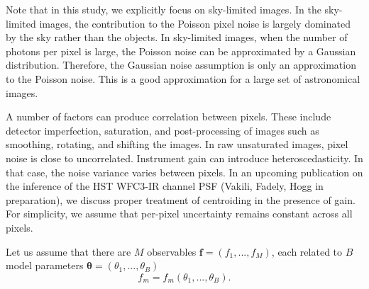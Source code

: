 \documentclass[onecolumn]{aastex61}
\newcommand{\beq}{\begin{equation}}
\newcommand{\eeq}{\end{equation}}
\newcommand{\todo}[1]{{\textcolor{dred}{ #1}}}
\begin{document}

\todo{Note that in this study, we explicitly focus on sky-limited images. In the sky-limited images, the contribution 
to the Poisson pixel noise is largely dominated by the sky rather than the objects. In sky-limited images, when the number of photons per pixel is large, the Poisson noise can be approximated by a Gaussian distribution. Therefore, the Gaussian noise assumption is only an approximation to the Poisson noise. This is a good approximation for a large set of astronomical images.} 

\todo{A number of factors can produce correlation between pixels. These include detector imperfection, saturation, and post-processing of images such as smoothing, rotating, and shifting the images. In raw unsaturated images, pixel noise is close to uncorrelated. Instrument gain can introduce heteroscedasticity. In that case, the noise variance varies between pixels. In an upcoming publication on the inference of the HST WFC3-IR channel PSF (Vakili, Fadely, Hogg in preparation), we discuss proper treatment of centroiding in the presence of gain. For simplicity, we assume that per-pixel uncertainty remains constant across all pixels.} 


Let us assume that there are $M$ observables $\mathbf{f} = (f_{1}, ... , f_{M})$, each
related to $B$ model parameters $\boldsymbol{\mathbf{\theta}} = (\theta_{1} , ... , \theta_{B})$ 
\beq
f_{m} = f_{m}(\theta_{1} , ... , \theta_{B}).
\label{genmodel}
\eeq
\end{document}
